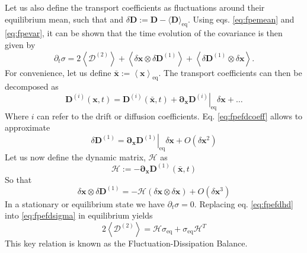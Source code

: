 \documentclass[ twoside,openright,titlepage,numbers=noenddot,%
headinclude,footinclude,cleardoublepage=empty,abstract=on,
BCOR=5mm,paper=a4,fontsize=11pt, dvipsnames
]{scrreprt}
\renewcommand{\vec}[1]{\bm{#1}}
\newcommand{\tens}[1]{\bm{\mathcal{#1}}}
\begin{document}
Let us also define the transport coefficients as fluctuations around their equilibrium mean, such that and $\delta\vec{D} := \vec{D} - \langle\vec{D}\rangle_{\text{eq}}$.
Using eqs. \eqref{eq:fpemean} and \eqref{eq:fpevar}, it can be shown that the time evolution of the covariance is then given by
\begin{equation}
  \label{eq:fpefdsigma}
 \partial_t\tens{\sigma} = 2\left\langle\tens{D}^{(2)} \right\rangle + \left\langle \delta\vec{x}\otimes\delta\vec{D}^{(1)} \right\rangle + \left\langle \delta\vec{D}^{(1)}\otimes\delta\vec{x} \right\rangle.
\end{equation}
For convenience, let us define $\bar{\vec{x}}:=\left\langle\vec{x}\right\rangle_{\text{eq}}$.
The transport coefficients can then be decomposed as
\begin{equation}
  \label{eq:fpefdcoeff}
  \vec{D}^{(i)}(\vec{x}, t) = \vec{D}^{(i)}(\bar{\vec{x}}, t) + \left.\vec{\partial}_{\vec{x}}\vec{D}^{(i)}\right|_{\text{eq}}\delta\vec{x}+\dots
\end{equation}
Where $i$ can refer to the drift or diffusion coefficients.
Eq. \eqref{eq:fpefdcoeff} allows to approximate
\begin{equation}
  \delta\vec{D}^{(1)} = \left.\vec{\partial}_{\vec{x}}\vec{D}^{(1)}\right|_{\text{eq}}\delta\vec{x} + O\left(\delta\vec{x}^2\right)
\end{equation}
Let us now define the dynamic matrix, $\tens{H}$ as
\begin{equation}
  \tens{H} := -\vec{\partial}_{\vec{x}}\vec{D}^{(1)}(\bar{\vec{x}},t)
\end{equation}
So that
\begin{equation}
  \label{eq:fpefdhd}
  \delta\vec{x}\otimes\delta\vec{D}^{(1)} = -\tens{H}\left(\delta\vec{x}\otimes\delta\vec{x}\right) + O\left(\delta\vec{x}^3\right)
\end{equation}
In a stationary or equilibrium state we have $\partial_t\tens{\sigma} = 0$. Replacing eq. \eqref{eq:fpefdhd} into \eqref{eq:fpefdsigma} in equilibrium yields
\begin{equation}
  \label{eq:fpefdbal}
  2\left\langle\tens{D}^{(2)}\right\rangle = \tens{H}\tens{\sigma}_{\text{eq}} + \tens{\sigma}_{\text{eq}}\tens{H}^T
\end{equation}
This key relation is known as the Fluctuation-Dissipation Balance.
\end{document}

